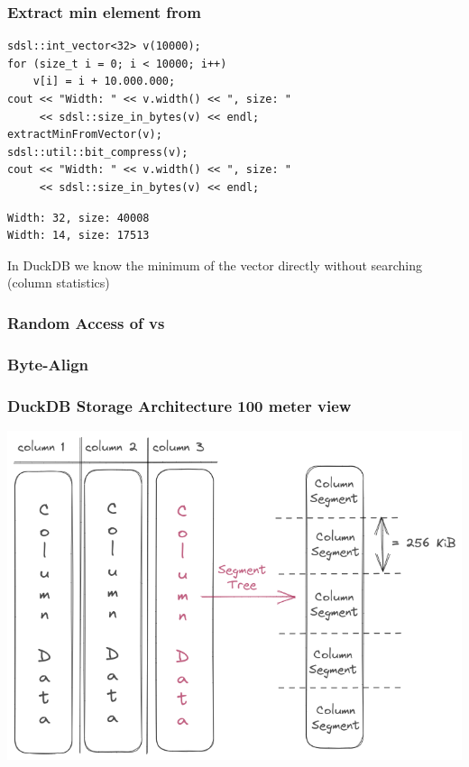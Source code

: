 \documentclass{beamer}
\begin{document}
\begin{frame}[fragile]
    \frametitle{Extract min element from }
\begin{lstlisting}[style=C++]
sdsl::int_vector<32> v(10000);
for (size_t i = 0; i < 10000; i++) 
    v[i] = i + 10.000.000;
cout << "Width: " << v.width() << ", size: " 
     << sdsl::size_in_bytes(v) << endl;
extractMinFromVector(v);
sdsl::util::bit_compress(v);
cout << "Width: " << v.width() << ", size: " 
     << sdsl::size_in_bytes(v) << endl;
\end{lstlisting}

\begin{lstlisting}[style=shell]
Width: 32, size: 40008
Width: 14, size: 17513
\end{lstlisting}

\pause
In DuckDB we know the minimum of the vector directly without searching (column statistics)
\end{frame}


\begin{frame}[fragile]
    \frametitle{Random Access of  vs }

\end{frame}


\begin{frame}
    \frametitle{Byte-Align }
\end{frame}


\begin{frame}
    \frametitle{DuckDB Storage Architecture 100 meter view}
    \includegraphics[width=\framewidth]{figures/excalidraw/duckdb-high-level-storage-arch.png}
\end{frame}
\end{document}
